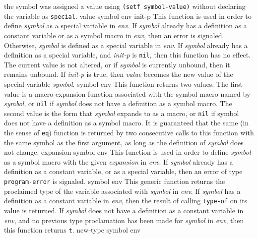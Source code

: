the symbol was assigned a value using \texttt{(setf symbol-value)}
without declaring the variable as \texttt{special}.
\vskip -0.02cm
 {value symbol env init-p}
\vskip -0.2cm
This function is used in order to define \textit{symbol} as a special
variable in \textit{env}.
\vskip -0.02cm
If \textit{symbol} already has a definition as a constant variable or as a
symbol macro in \textit{env}, then an error is signaled.
Otherwise, \textit{symbol} is defined as a special variable in \textit{env}.
\vskip -0.02cm
If \textit{symbol} already has a definition as a special variable, and
\textit{init-p} is \texttt{nil}, then this function has no effect.  The
current value is not altered, or if \textit{symbol} is currently
unbound, then it remains unbound.
\vskip -0.02cm
If \textit{init-p} is true, then \textit{value} becomes the new
value of the special variable \textit{symbol}.
\vskip -0.02cm
 {symbol env}
\vskip -0.2cm
This function returns two values.  The first value is a macro
expansion function associated with the symbol macro named by \textit{symbol},
or \texttt{nil} if \textit{symbol} does not have a definition as a symbol
macro.  The second value is the form that \textit{symbol} expands to as a
macro, or \texttt{nil} if symbol does not have a definition as a
symbol macro.
\vskip -0.02cm
It is guaranteed that the same (in the sense of \texttt{eq}) function
is returned by two consecutive calls to this function with the same
symbol as the first argument, as long as the definition
of \textit{symbol} does not change.
\vskip -0.02cm
 {expansion symbol env}
\vskip -0.2cm
This function is used in order to define \textit{symbol} as a symbol macro
with the given \textit{expansion} in \textit{env}.
\vskip -0.02cm
If \textit{symbol} already has a definition as a constant variable, or
as a special variable, then an error of type \texttt{program-error} is
signaled.
\vskip -0.02cm
 {symbol env}
\vskip -0.2cm
This generic function returns the proclaimed type of the variable
associated with \textit{symbol} in \textit{env}.
\vskip -0.02cm
If \textit{symbol} has a definition as a constant variable in \textit{env},
then the result of calling \texttt{type-of} on its value is returned.
\vskip -0.02cm
If \textit{symbol} does not have a definition as a constant variable in
\textit{env}, and no previous type proclamation has been made for
\textit{symbol} in \textit{env}, then this function returns \texttt{t}.
\vskip -0.02cm
 {new-type symbol env}
